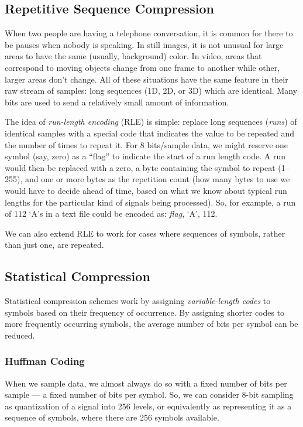 \subsection{Repetitive Sequence Compression}

When two people are having a telephone conversation, it is common for
there to be pauses when nobody is speaking. In still images, it is not
unusual for large areas to have the same (usually, background)
color. In video, areas that correspond to moving objects change from
one frame to another while other, larger areas don't change.  All of
these situations have the same feature in their raw stream of samples:
long sequences (1D, 2D, or 3D) which are identical. Many bits are used
to send a relatively small amount of information.

The idea of \emph{run-length encoding} (RLE) is simple: replace long
sequences (\emph{runs}) of identical samples with a special code that
indicates the value to be repeated and the number of times to repeat
it. For 8 bits/sample data, we might reserve one symbol (say, zero) as
a ``flag'' to indicate the start of a run length code. A run would
then be replaced with a zero, a byte containing the symbol to repeat
(1--255), and one or more bytes as the repetition count (how many
bytes to use we would have to decide ahead of time, based on what we
know about typical run lengths for the particular kind of signals
being processed). So, for example, a run of 112 `A's in a text file
could be encoded as: \textit{flag}, `A', 112.

We can also extend RLE to work for cases where sequences of symbols,
rather than just one, are repeated.

\subsection{Statistical Compression}

Statistical compression schemes work by assigning
\emph{variable-length codes} to symbols based on their frequency of
occurrence.  By assigning shorter codes to more frequently occurring
symbols, the average number of bits per symbol can be reduced.

\subsubsection{Huffman Coding}

When we sample data, we almost always do so with a fixed number of
bits per sample --- a fixed number of bits per symbol. So, we can
consider 8-bit sampling as quantization of a signal into 256 levels,
or equivalently as representing it as a sequence of symbols, where
there are 256 symbols available.

